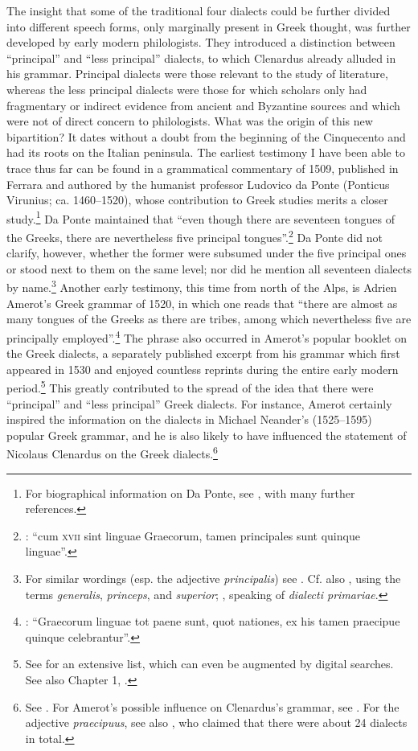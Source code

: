 The insight that some of the traditional four dialects could be further divided into different speech forms, only marginally present in Greek thought, was further developed by early modern philologists. They introduced a distinction between “principal” and “less principal” dialects, to which Clenardus already alluded in his grammar. Principal dialects were those relevant to the study of literature, whereas the less principal dialects were those for which scholars only had fragmentary or indirect evidence from ancient and Byzantine sources and which were not of direct concern to philologists. What was the origin of this new bipartition? It dates without a doubt from the beginning of the Cinquecento and had its roots on the Italian peninsula. The earliest testimony I have been able to trace thus far can be found in a grammatical commentary of 1509, published in Ferrara and authored by the humanist professor Ludovico da Ponte (Ponticus Virunius; ca. 1460–1520), whose contribution to Greek studies merits a closer study.\footnote{For biographical information on Da Ponte, see \citet{Ricciardi1986}, with many further references.} Da Ponte maintained that “even though there are seventeen tongues of the Greeks, there are nevertheless five principal tongues”.\footnote{: “cum \textsc{xvii} sint linguae Graecorum, tamen principales sunt quinque linguae”.} Da Ponte did not clarify, however, whether the former were subsumed under the five principal ones or stood next to them on the same level; nor did he mention all seventeen dialects by name.\footnote{For similar wordings (esp. the adjective \textit{principalis}) see \citet[51--52]{Oecolampadius1518}. Cf. also \citet[12, a.3\textsc{\textsuperscript{v}}]{Canini1554, Canini1555}, using the terms \textit{generalis}, \textit{princeps}, and \textit{superior}; \citet[2]{Walper1589}, speaking of \textit{dialecti primariae}.} Another early testimony, this time from north of the Alps, is Adrien Amerot’s Greek grammar of 1520, in which one reads that “there are almost as many tongues of the Greeks as there are tribes, among which nevertheless five are principally employed”.\footnote{\citet[\textsc{q}.i\textsc{\textsuperscript{v}}]{Amerot1520}: “Graecorum linguae tot paene sunt, quot nationes, ex his tamen praecipue quinque celebrantur”.} The phrase also occurred in Amerot’s popular booklet on the Greek dialects, a separately published excerpt from his grammar which first appeared in 1530 and enjoyed countless reprints during the entire early modern period.\footnote{See \citet[5--19]{Hoven1985} for an extensive list, which can even be augmented by digital searches. See also Chapter 1, .} This greatly contributed to the spread of the idea that there were “principal” and “less principal” Greek dialects. For instance, Amerot certainly inspired the information on the dialects in Michael Neander’s (1525–1595) popular Greek grammar, and he is also likely to have influenced the statement of Nicolaus Clenardus on the Greek dialects.\footnote{See \citet[187]{Neander1553}. For Amerot’s possible influence on Clenardus’s grammar, see \citet{VanRooy2019}. For the adjective \textit{praecipuus}, see also \citet[42]{Mosellanus1527}, who claimed that there were about 24 dialects in total.}

